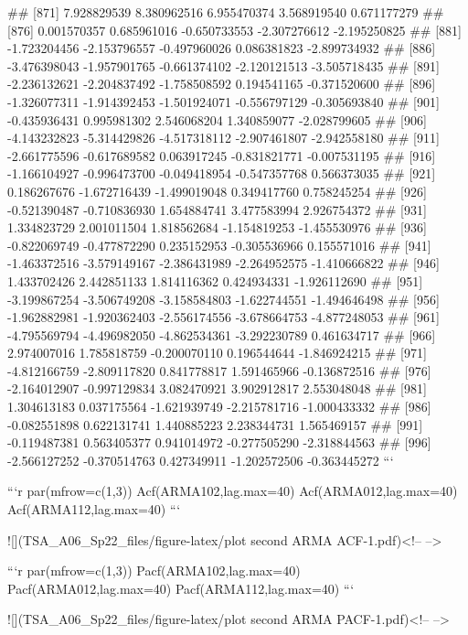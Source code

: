 \documentclass[
]{article}
\begin{document}
\begin{enumerate}[label=(\alph*)]
##  [871]  7.928829539  8.380962516  6.955470374  3.568919540  0.671177279
##  [876]  0.001570357  0.685961016 -0.650733553 -2.307276612 -2.195250825
##  [881] -1.723204456 -2.153796557 -0.497960026  0.086381823 -2.899734932
##  [886] -3.476398043 -1.957901765 -0.661374102 -2.120121513 -3.505718435
##  [891] -2.236132621 -2.204837492 -1.758508592  0.194541165 -0.371520600
##  [896] -1.326077311 -1.914392453 -1.501924071 -0.556797129 -0.305693840
##  [901] -0.435936431  0.995981302  2.546068204  1.340859077 -2.028799605
##  [906] -4.143232823 -5.314429826 -4.517318112 -2.907461807 -2.942558180
##  [911] -2.661775596 -0.617689582  0.063917245 -0.831821771 -0.007531195
##  [916] -1.166104927 -0.996473700 -0.049418954 -0.547357768  0.566373035
##  [921]  0.186267676 -1.672716439 -1.499019048  0.349417760  0.758245254
##  [926] -0.521390487 -0.710836930  1.654884741  3.477583994  2.926754372
##  [931]  1.334823729  2.001011504  1.818562684 -1.154819253 -1.455530976
##  [936] -0.822069749 -0.477872290  0.235152953 -0.305536966  0.155571016
##  [941] -1.463372516 -3.579149167 -2.386431989 -2.264952575 -1.410666822
##  [946]  1.433702426  2.442851133  1.814116362  0.424934331 -1.926112690
##  [951] -3.199867254 -3.506749208 -3.158584803 -1.622744551 -1.494646498
##  [956] -1.962882981 -1.920362403 -2.556174556 -3.678664753 -4.877248053
##  [961] -4.795569794 -4.496982050 -4.862534361 -3.292230789  0.461634717
##  [966]  2.974007016  1.785818759 -0.200070110  0.196544644 -1.846924215
##  [971] -4.812166759 -2.809117820  0.841778817  1.591465966 -0.136872516
##  [976] -2.164012907 -0.997129834  3.082470921  3.902912817  2.553048048
##  [981]  1.304613183  0.037175564 -1.621939749 -2.215781716 -1.000433332
##  [986] -0.082551898  0.622131741  1.440885223  2.238344731  1.565469157
##  [991] -0.119487381  0.563405377  0.941014972 -0.277505290 -2.318844563
##  [996] -2.566127252 -0.370514763  0.427349911 -1.202572506 -0.363445272
```


```r
par(mfrow=c(1,3))
Acf(ARMA102,lag.max=40)
Acf(ARMA012,lag.max=40)
Acf(ARMA112,lag.max=40)
```

![](TSA_A06_Sp22_files/figure-latex/plot second ARMA ACF-1.pdf)<!-- --> 


```r
par(mfrow=c(1,3))
Pacf(ARMA102,lag.max=40)
Pacf(ARMA012,lag.max=40)
Pacf(ARMA112,lag.max=40)
```

![](TSA_A06_Sp22_files/figure-latex/plot second ARMA PACF-1.pdf)<!-- --> 

\end{enumerate}
\end{document}
